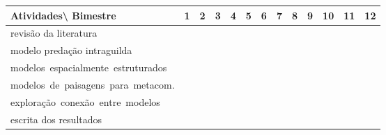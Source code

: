 \documentclass[12pt]{extarticle}
\begin{document}
\begin{table}[htb] 
\small
\noindent
\begin{tabular}{p{6cm}|p{0.3cm}p{0.3cm}p{0.3cm}p{0.3cm}p{0.3cm}p{0.3cm}p{0.3cm}p{0.3cm}p{0.3cm}p{0.3cm}p{0.3cm}p{0.3cm}}
    {\normalsize Atividades\textbackslash\hspace{0.1cm} Bimestre} & 1 & 2 & 3 & 4 & 5 & 6 & 7 & 8
                                                                & 9 & 10 & 11 & 12 \\ \hline 
                                              revisão da literatura& \cellcolor[gray]{0.8} & \cellcolor[gray]{0.8} &  &  &  &  &  &  &  &  &  &   \\
                                    modelo predação intraguilda &
                                          \cellcolor[gray]{0.8} &
                                          \cellcolor[gray]{0.8} &
                                          \cellcolor[gray]{0.8} &
                                          \cellcolor[gray]{0.8} &
                                          \cellcolor[gray]{0.8} & & & & & & & \\
                                    \mbox{modelos espacialmente estruturados} & & & &
                                          \cellcolor[gray]{0.8} &
                                          \cellcolor[gray]{0.8} &
                                          \cellcolor[gray]{0.8} &
                                          \cellcolor[gray]{0.8} &
                                          \cellcolor[gray]{0.8} & & & & \\
                                    \mbox{modelos de paisagens para metacom.} & & & & & & &
                                          \cellcolor[gray]{0.8} &
                                          \cellcolor[gray]{0.8} &
                                          \cellcolor[gray]{0.8} &
                                          \cellcolor[gray]{0.8} &
                                          \cellcolor[gray]{0.8} & \\
                                     \mbox{exploração conexão entre modelos} & & &
                                          \cellcolor[gray]{0.8} &
                                          \cellcolor[gray]{0.8} &
                                          \cellcolor[gray]{0.8} &
                                          \cellcolor[gray]{0.8} &
                                          \cellcolor[gray]{0.8} &
                                          \cellcolor[gray]{0.8} &
                                          \cellcolor[gray]{0.8} &
                                          \cellcolor[gray]{0.8} &
                                          \cellcolor[gray]{0.8} & \\ 
                                    escrita dos resultados & & & & & 
                                          \cellcolor[gray]{0.8} &
                                          \cellcolor[gray]{0.8} & & & & &
                                          \cellcolor[gray]{0.8} &
    \cellcolor[gray]{0.8} \\
\end{tabular}
\end{table}
\end{document}
